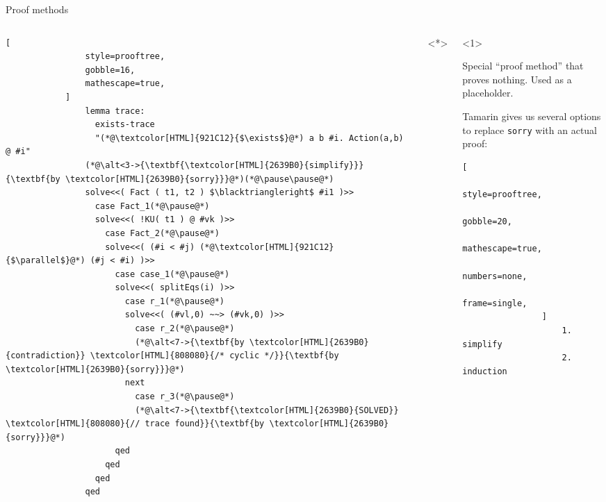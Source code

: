 \documentclass[11pt,aspectratio=169]{beamer}
\begin{document}
\begin{frame}[fragile]{Proof methods}
    \begin{columns}[T]
        \begin{column}{0.55\textwidth}
            \vspace*{.25cm}
            \begin{lstlisting}[
                style=prooftree,
                gobble=16,
                mathescape=true,
            ]
                lemma trace:
                  exists-trace
                  "(*@\textcolor[HTML]{921C12}{$\exists$}@*) a b #i. Action(a,b) @ #i"
                (*@\alt<3->{\textbf{\textcolor[HTML]{2639B0}{simplify}}}{\textbf{by \textcolor[HTML]{2639B0}{sorry}}}@*)(*@\pause\pause@*)
                solve<<( Fact ( t1, t2 ) $\blacktriangleright$ #i1 )>>
                  case Fact_1(*@\pause@*)
                  solve<<( !KU( t1 ) @ #vk )>>
                    case Fact_2(*@\pause@*)
                    solve<<( (#i < #j) (*@\textcolor[HTML]{921C12}{$\parallel$}@*) (#j < #i) )>>
                      case case_1(*@\pause@*)
                      solve<<( splitEqs(i) )>>
                        case r_1(*@\pause@*)
                        solve<<( (#vl,0) ~~> (#vk,0) )>>
                          case r_2(*@\pause@*)
                          (*@\alt<7->{\textbf{by \textcolor[HTML]{2639B0}{contradiction}} \textcolor[HTML]{808080}{/* cyclic */}}{\textbf{by \textcolor[HTML]{2639B0}{sorry}}}@*)
                        next
                          case r_3(*@\pause@*)
                          (*@\alt<7->{\textbf{\textcolor[HTML]{2639B0}{SOLVED}} \textcolor[HTML]{808080}{// trace found}}{\textbf{by \textcolor[HTML]{2639B0}{sorry}}}@*)
                      qed
                    qed
                  qed
                qed
            \end{lstlisting}
        \end{column}
        \onslide<*>
        \begin{column}{0.45\textwidth}
            \begin{onlyenv}<1>
                \begin{tcolorbox}[
                    title = {\fontfamily{pcr}\fontseries{b}\selectfont sorry},
                    left = 1mm,
                    top = 1mm,
                    right = 1mm,
                    bottom = 1mm,
                ]
                    Special ``proof method'' that proves nothing. Used as a 
                    placeholder.
                \end{tcolorbox}
                Tamarin gives us several options to replace \texttt{sorry} with an actual proof:
                \begin{lstlisting}[
                    style=prooftree,
                    gobble=20,
                    mathescape=true,
                    numbers=none,
                    frame=single,
                ]
                    1. simplify
                    2. induction


\end{lstlisting}
\end{onlyenv}
\end{column}
\end{columns}
\end{frame}
\end{document}
